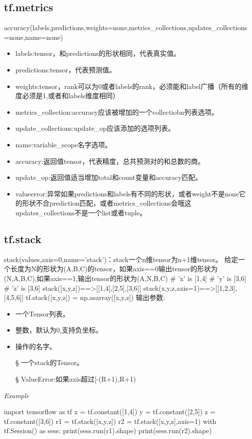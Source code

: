 \subsection{tf.metrics}
accuracy(labels,predictions,weights=none,metrics\_collections,updates\_collections=none,name=none)
\begin{itemize}
	\item labels:tensor，和predictions的形状相同，代表真实值。
	\item predictions:tensor，代表预测值。
	\item weights:tensor，rank可以为0或者labels的rank，必须能和label广播（所有的维度必须是1,或者和labels维度相同）
	\item metrics\_collection:accuracy应该被增加的一个collectiobn列表选项。
	\item update\_collections:update\_op应该添加的选项列表。
	\item name:variable\_scope名字选项。
	\item accuracy:返回值tensor，代表精度，总共预测对的和总数的商。
	\item update\_op:返回值适当增加total和count变量和accuracy匹配。
	\item valueerror:异常如果predictions和labels有不同的形状，或者weight不是none它的形状不合prediction匹配，或者metrics\_collections会哦这updates\_collections不是一个list或者tuple。
\end{itemize}

\subsection{tf.stack}
stack(values,axis=0,name='stack')：stack一个n维tensor为n+1维tensor。
给定一个长度为N的形状为(A,B,C)的tensor，如果axis==0输出tensor的形状为(N,A,B,C),如果axis==1,输出tensor的形状为(A,N,B,C)
\# 'x' is [1,4]\newline
\# 'y' is [3,6]\newline
\# 'z' is [3,6]\newline
stack([x,y,z])==>[[1,4],[2,5],[3,6]]\newline
stack(x,y,z,axis=1)==>[[1,2,3],[4,5,6]]\newline
tf.stack([x,y,z]) = np.asarray([x,y,z])\newline
输出参数:
\begin{itemize}
	\item 一个Tensor列表。
	\item 整数，默认为0,支持负坐标。
	\item 操作的名字。
	\item[\S] 一个stack的Tensor。
	\item[\S] ValueError:如果axis超过[-(R+1),R+1)
\end{itemize}
\textsl{Example}
\begin{python}
import tensorflow as tf
x = tf.constant([1,4])
y = tf.constant([2,5])
z = tf.constant([3,6])
r1 = tf.stack([x,y,z])
r2 = tf.stack([x,y,z],axis=1)
with tf.Session() as sess:
    print(sess.run(r1).shape)
    print(sess.run(r2).shape)
\end{python}
